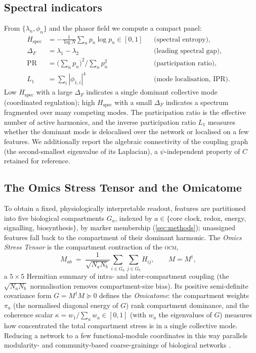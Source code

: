\documentclass[preprint,12pt,amsmath,amssymb,superscriptaddress,floatfix]{revtex4-2}
\theoremstyle{definition}
\theoremstyle{plain}
\newcommand{\OCM}{\textsc{ocm}}
\newcommand{\PR}{\mathrm{PR}}
\newcommand{\Hspec}{H_{\mathrm{spec}}}
\begin{document}
\subsection{Spectral indicators}
\label{sec:theory-indicators}

From $\{\lambda_n,\phi_n\}$ and the phasor field we compute a compact panel:
\begin{align}
  \Hspec &= -\tfrac{1}{\log N}\textstyle\sum_n p_n\log p_n \in[0,1]
    &&\text{(spectral entropy)},\\
  \Delta_F &= \lambda_1-\lambda_2 &&\text{(leading spectral gap)},\\
  \PR &= \big(\textstyle\sum_n p_n\big)^2 \big/ \textstyle\sum_n p_n^2
    &&\text{(participation ratio)},\\
  L_1 &= \textstyle\sum_i |\phi_{1,i}|^4 &&\text{(mode localisation, IPR)}.
\end{align}
Low $\Hspec$ with a large $\Delta_F$ indicates a single dominant collective mode
(coordinated regulation); high $\Hspec$ with a small $\Delta_F$ indicates a
spectrum fragmented over many competing modes. The participation ratio is the
effective number of active harmonics, and the inverse participation ratio $L_1$
measures whether the dominant mode is delocalised over the network or localised
on a few features. We additionally report the algebraic connectivity of the
coupling graph (the second-smallest eigenvalue of its Laplacian), a
$\psi$-independent property of $C$ retained for reference.

\subsection{The Omics Stress Tensor and the Omicatome}
\label{sec:theory-ost}

To obtain a fixed, physiologically interpretable readout, features are
partitioned into five biological compartments $G_a$, indexed by $a\in\{$core
clock, redox, energy, signalling, biosynthesis$\}$, by marker membership
(\cref{sec:methods}); unassigned features fall back to the compartment of their
dominant harmonic. The \emph{Omics Stress Tensor} is the compartment contraction
of the \OCM,
\begin{equation}
  M_{ab} \;=\; \frac{1}{\sqrt{N_a N_b}}
    \sum_{i\in G_a}\sum_{j\in G_b} H_{ij},
  \qquad M = M^{\dagger},
  \label{eq:ost}
\end{equation}
a $5\times5$ Hermitian summary of intra- and inter-compartment coupling
(the $\sqrt{N_aN_b}$ normalisation removes compartment-size bias). Its positive
semi-definite covariance form $G = M^{\dagger}M \succeq 0$ defines the
\emph{Omicatome}: the compartment weights $\pi_a$ (the normalised diagonal energy
of $G$) rank compartment dominance, and the coherence scalar
$\kappa = w_1/\sum_a w_a \in[0,1]$ (with $w_a$ the eigenvalues of $G$) measures
how concentrated the total compartment stress is in a single collective mode.
Reducing a network to a few functional-module coordinates in this way parallels
modularity- and community-based coarse-grainings of biological networks
\citep{newman2006modularity, barabasi2011network}.
\end{document}

